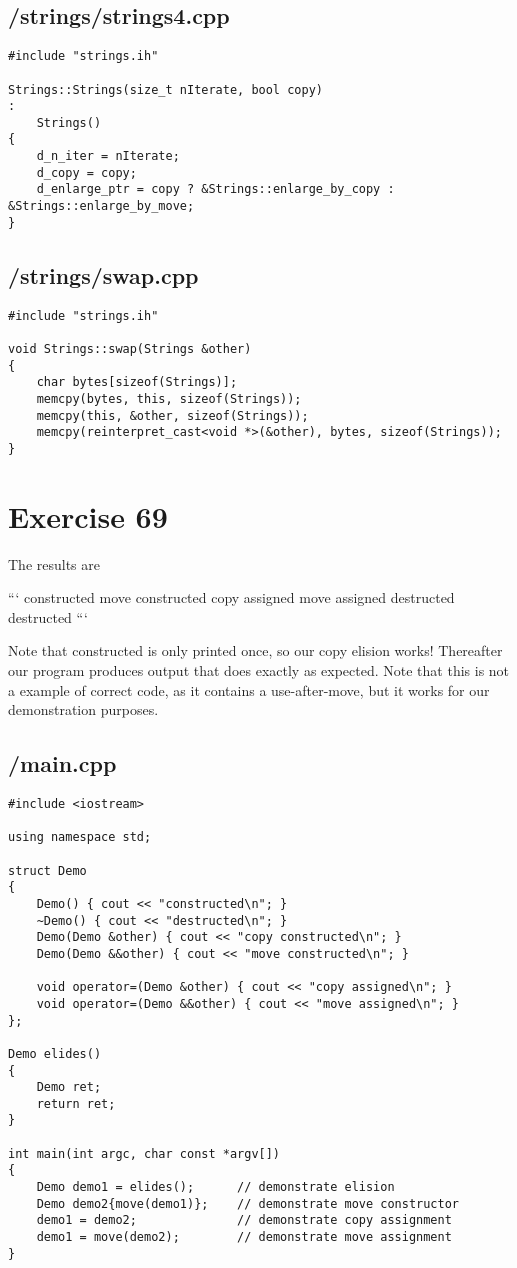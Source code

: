 \documentclass{article}
\begin{document}
\subsection*{/strings/strings4.cpp}
\begin{verbatim}
#include "strings.ih"

Strings::Strings(size_t nIterate, bool copy)
:
    Strings()
{
    d_n_iter = nIterate;
    d_copy = copy;
    d_enlarge_ptr = copy ? &Strings::enlarge_by_copy : &Strings::enlarge_by_move;
}
\end{verbatim}
\subsection*{/strings/swap.cpp}
\begin{verbatim}
#include "strings.ih"

void Strings::swap(Strings &other)
{
    char bytes[sizeof(Strings)];
    memcpy(bytes, this, sizeof(Strings));
    memcpy(this, &other, sizeof(Strings));
    memcpy(reinterpret_cast<void *>(&other), bytes, sizeof(Strings));
}

\end{verbatim}


\section*{Exercise 69}
The results are

```
constructed
move constructed
copy assigned
move assigned
destructed
destructed
```

Note that constructed is only printed once, so our copy elision works! Thereafter our program produces output that does exactly as expected. Note that this is not a example of correct code, as it contains a use-after-move, but it works for our demonstration purposes.

\subsection*{/main.cpp}
\begin{verbatim}
#include <iostream>

using namespace std;

struct Demo
{
    Demo() { cout << "constructed\n"; }
    ~Demo() { cout << "destructed\n"; }
    Demo(Demo &other) { cout << "copy constructed\n"; }
    Demo(Demo &&other) { cout << "move constructed\n"; }

    void operator=(Demo &other) { cout << "copy assigned\n"; }
    void operator=(Demo &&other) { cout << "move assigned\n"; }
};

Demo elides()
{
    Demo ret;
    return ret;
}

int main(int argc, char const *argv[])
{
    Demo demo1 = elides();      // demonstrate elision
    Demo demo2{move(demo1)};    // demonstrate move constructor
    demo1 = demo2;              // demonstrate copy assignment
    demo1 = move(demo2);        // demonstrate move assignment
}

\end{verbatim}
\end{document}
